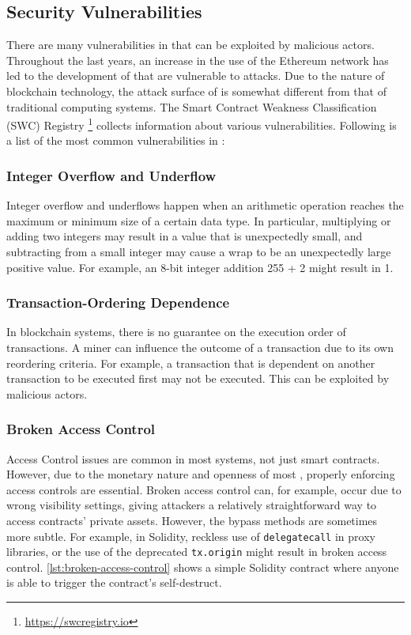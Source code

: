\subsection{Security Vulnerabilities}
\label{sec:smart-contract-vulnerabilities}
There are many vulnerabilities in  that can be exploited by malicious actors. Throughout the last years, an increase in the use of the Ethereum network has led to the development of  that are vulnerable to attacks. Due to the nature of blockchain technology, the attack surface of  is somewhat different from that of traditional computing systems. The Smart Contract Weakness Classification (SWC) Registry \footnote{\url{https://swcregistry.io}} collects information about various vulnerabilities. Following is a list of the most common vulnerabilities in :

\subsubsection{Integer Overflow and Underflow}
Integer overflow and underflows happen when an arithmetic operation reaches the maximum or minimum size of a certain data type. In particular, multiplying or adding two integers may result in a value that is unexpectedly small, and subtracting from a small integer may cause a wrap to be an unexpectedly large positive value. For example, an 8-bit integer addition 255 + 2 might result in 1.

\subsubsection{Transaction-Ordering Dependence}
In blockchain systems, there is no guarantee on the execution order of transactions. A miner can influence the outcome of a transaction due to its own reordering criteria. For example, a transaction that is dependent on another transaction to be executed first may not be executed. This can be exploited by malicious actors. 

\subsubsection{Broken Access Control}
Access Control issues are common in most systems, not just smart contracts. However, due to the monetary nature and openness of most , properly enforcing access controls are essential. Broken access control can, for example, occur due to wrong visibility settings, giving attackers a relatively straightforward way to access contracts' private assets. However, the bypass methods are sometimes more subtle. For example, in Solidity, reckless use of \lstinline[language=Solidity]!delegatecall! in proxy libraries, or the use of the deprecated \lstinline[language=Solidity]!tx.origin! might result in broken access control. \cref{lst:broken-access-control} shows a simple Solidity contract where anyone is able to trigger the contract's self-destruct.

